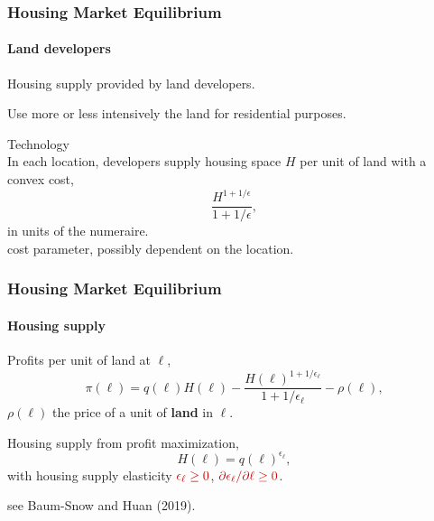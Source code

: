 \documentclass[aspectratio=169]{beamer}
\begin{document}
\begin{v75mins}
\begin{frame}[label=landdevelopers]
\frametitle{Housing Market Equilibrium}
\framesubtitle{Land developers}
\bi
\item Housing supply provided by land developers. \hyperlink{comics}{}
\item Use more or less intensively the land for residential purposes.
\item Technology\\
\medskip
In each location, developers supply housing space $H$ per unit of land with a convex cost,
\begin{equation*}
\frac{H^{1+1/\epsilon}}{1+1/\epsilon},
\end{equation*}
in units of the numeraire.\\
 \re{$\epsilon=$} cost parameter, possibly dependent on the location.
\ei
\end{frame}

\begin{frame}
\frametitle{Housing Market Equilibrium}
\framesubtitle{Housing supply}
\bi
\item Profits per unit of land at $\ell$,
\begin{equation*}
\pi(\ell)=q(\ell)H(\ell)-\frac{H(\ell)^{1+1/\epsilon_{\ell}}}{ 1+1/\epsilon_{\ell} }- \rho(\ell),
\end{equation*}
$\rho(\ell)$ the price of a unit of \textbf{land} in $\ell$.
\item Housing supply from profit maximization,
\begin{equation*}
H(\ell)=q(\ell) ^{\epsilon_{\ell}},
\end{equation*}
with housing supply elasticity  $\re{\epsilon_{\ell}\geq 0}$, $\re{\partial\epsilon_{\ell}/\partial \ell \geq 0}$.

see Baum-Snow and Huan (2019).  %
\ei
\end{frame}


\end{v75mins}
\end{document}
